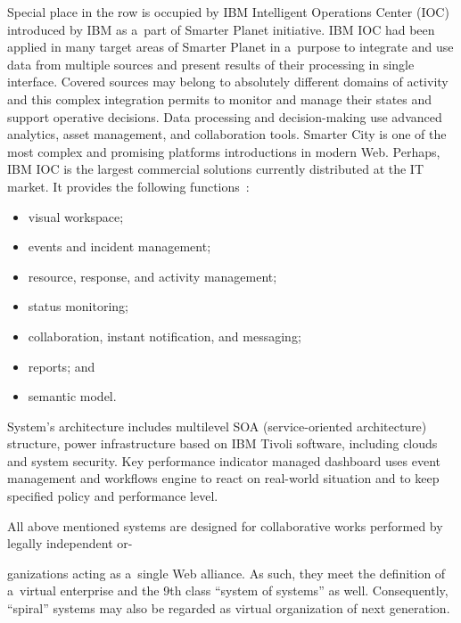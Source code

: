 \begin{multicols}{2}
Special place in the row is occupied by IBM Intelligent Operations Center (IOC) introduced by IBM as
a~part of Smarter Planet initiative. IBM IOC had been applied in many target areas of Smarter Planet in
a~purpose to integrate and use data from multiple sources and present results of their processing in single
interface. Covered sources may belong to absolutely different domains of activity and this complex
integration permits to monitor and manage their states and support operative decisions. Data processing and
decision-making use advanced analytics, asset management, and collaboration tools. Smarter City is one of
the most complex and promising platforms introductions in modern Web. Perhaps, IBM IOC is the largest
commercial solutions currently distributed at the IT market. It provides
the following functions~\cite{9-sor}:
\begin{itemize}
  \item visual workspace;\\[-14pt]
  \item events and incident management;\\[-14pt]
  \item resource, response, and activity management;\\[-14pt]
  \item status monitoring;\\[-14pt]
  \item  collaboration, instant notification, and messaging;\\[-14pt]
  \item  reports; and\\[-14pt]
  \item semantic model.
  \end{itemize}

System's architecture includes multilevel SOA (service-oriented architecture)
structure, power infrastructure based on IBM Tivoli
software, including clouds and system security. Key performance indicator
managed dashboard uses event management and
workflows engine to react on real-world situation
and to keep specified policy and performance level.

 All above mentioned systems are designed for collaborative works performed by legally independent
or-\linebreak\vspace*{-12pt}

\columnbreak

\noindent
ganizations acting as a~single Web alliance. As such, they meet the definition of a~virtual enterprise
and the 9th class ``system of systems'' as well. Consequently, ``spiral'' systems may also be regarded as
virtual organization of next generation.


\end{multicols}
